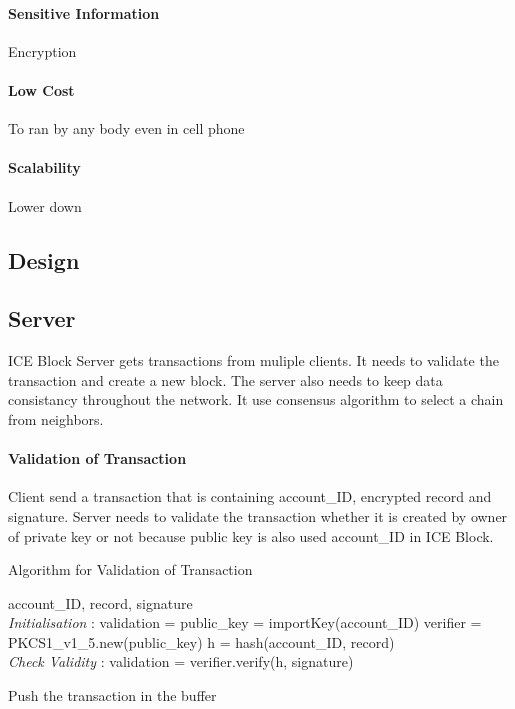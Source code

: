 \documentclass[conference]{IEEEtran}
\begin{document}
\paragraph{Sensitive Information}
Encryption

\paragraph{Low Cost}
To ran by any body even in cell phone

\paragraph{Scalability}
Lower down 


\subsection{Design}






\subsection{Server}
ICE Block Server gets transactions from muliple clients. It needs to validate the transaction and create a new block.
The server also needs to keep data consistancy throughout the network. It use consensus algorithm to select a chain from neighbors.

\paragraph{Validation of Transaction} 
Client send a transaction that is containing account\_ID, encrypted record and signature.
Server needs to validate the transaction whether it is created by owner of private key or not because public key is also used account\_ID in ICE Block.

\begin{algorithm}
    \caption{Algorithm for Validation of Transaction}
    \begin{algorithmic}[1]
        \renewcommand{\algorithmicrequire}{\textbf{Input:}}
        \renewcommand{\algorithmicensure}{\textbf{Output:}}
        \REQUIRE account\_ID, record, signature
        \\ \textit{Initialisation} :
        \STATE validation = \FALSE
        \STATE public\_key = importKey(account\_ID)
        \STATE verifier = PKCS1\_v1\_5.new(public\_key)
        \STATE h = hash(account\_ID, record)
        \\ \textit{Check Validity} :
        \STATE validation = verifier.verify(h, signature)

            \STATE Push the transaction in the buffer
        \ENDIF

    \end{algorithmic} 
\end{algorithm}
\end{document}
